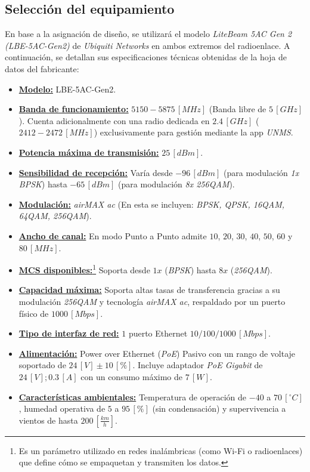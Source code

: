 \subsection{Selección del equipamiento}
\label{sec_2.8}
En base a la asignación de diseño, se utilizará el modelo \textit{LiteBeam 5AC Gen 2 (LBE-5AC-Gen2)} de \textit{Ubiquiti Networks} en ambos extremos del radioenlace. A continuación, se detallan sus especificaciones técnicas obtenidas de la hoja de datos del fabricante:
\begin{itemize}
    \item \textbf{\underline{Modelo:}} LBE-5AC-Gen2.
    \item \textbf{\underline{Banda de funcionamiento:}} $5150 - 5875 \, [MHz]$ (Banda libre de $5 \, [GHz]$). Cuenta adicionalmente con una radio dedicada en $2.4 \, [GHz]$ ($2412 - 2472 \, [MHz]$) exclusivamente para gestión mediante la app \textit{UNMS}.
    \item \textbf{\underline{Potencia máxima de transmisión:}} $25 \, [dBm]$.
    \item \textbf{\underline{Sensibilidad de recepción:}} Varía desde $-96 \, [dBm]$ (para modulación \textit{1x BPSK}) hasta $-65 \, [dBm]$ (para modulación \textit{8x 256QAM}).
    \item \textbf{\underline{Modulación:}} \textit{airMAX ac} (En esta se incluyen: \textit{BPSK, QPSK, 16QAM, 64QAM, 256QAM}).
    \item \textbf{\underline{Ancho de canal:}} En modo Punto a Punto admite $10$, $20$, $30$, $40$, $50$, $60$ y $80 \, [MHz]$.
    \item \textbf{\underline{MCS disponibles:}}\footnote{Es un parámetro utilizado en redes inalámbricas (como Wi-Fi o radioenlaces) que define cómo se empaquetan y transmiten los datos.} Soporta desde $1x$ (\textit{BPSK}) hasta $8x$ (\textit{256QAM}).
    \item \textbf{\underline{Capacidad máxima:}} Soporta altas tasas de transferencia gracias a su modulación \textit{256QAM} y tecnología \textit{airMAX ac}, respaldado por un puerto físico de $1000 \, [Mbps]$.
    \item \textbf{\underline{Tipo de interfaz de red:}} $1$ puerto Ethernet $10/100/1000 \, [Mbps]$.
    \item \textbf{\underline{Alimentación:}} Power over Ethernet (\textit{PoE}) Pasivo con un rango de voltaje soportado de $24 \, [V] \pm 10 \, [\%]$. Incluye adaptador \textit{PoE Gigabit} de $24 \, [V]; 0.3 \, [A]$ con un consumo máximo de $7 \, [W]$.
    \item \textbf{\underline{Características ambientales:}} Temperatura de operación de $-40$ a $70 \, [^{\circ}C]$, humedad operativa de $5$ a $95 \, [\%]$ (sin condensación) y supervivencia a vientos de hasta $200 \, [\frac{km}{h}]$.

\end{itemize}
